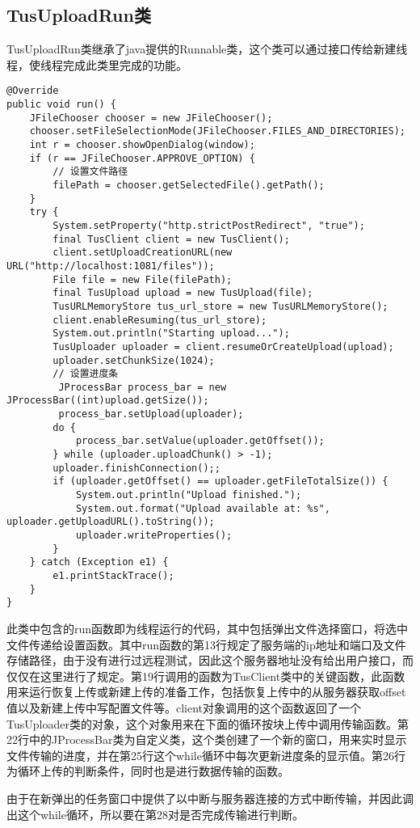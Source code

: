 \documentclass[bachelor]{thesis-uestc}
\begin{document}
\subsection{TusUploadRun类}
TusUploadRun类继承了java提供的Runnable类，这个类可以通过接口传给新建线程，使线程完成此类里完成的功能。
\begin{lstlisting}[title=TusUploadRun类中的线程运行函数]
@Override
public void run() {
	JFileChooser chooser = new JFileChooser();
	chooser.setFileSelectionMode(JFileChooser.FILES_AND_DIRECTORIES);
	int r = chooser.showOpenDialog(window);
	if (r == JFileChooser.APPROVE_OPTION) {
		// 设置文件路径
		filePath = chooser.getSelectedFile().getPath();
	}
	try {
		System.setProperty("http.strictPostRedirect", "true");
		final TusClient client = new TusClient();
		client.setUploadCreationURL(new URL("http://localhost:1081/files"));
		File file = new File(filePath);
		final TusUpload upload = new TusUpload(file);
		TusURLMemoryStore tus_url_store = new TusURLMemoryStore();
		client.enableResuming(tus_url_store);
		System.out.println("Starting upload...");
		TusUploader uploader = client.resumeOrCreateUpload(upload);
		uploader.setChunkSize(1024);
		// 设置进度条
		 JProcessBar process_bar = new JProcessBar((int)upload.getSize());
		 process_bar.setUpload(uploader);
		do {
			process_bar.setValue(uploader.getOffset());
		} while (uploader.uploadChunk() > -1);
		uploader.finishConnection();;
		if (uploader.getOffset() == uploader.getFileTotalSize()) {
			System.out.println("Upload finished.");
			System.out.format("Upload available at: %s", uploader.getUploadURL().toString());
			uploader.writeProperties();
		}
	} catch (Exception e1) {
		e1.printStackTrace();
	}
}
\end{lstlisting}
\par 此类中包含的run函数即为线程运行的代码，其中包括弹出文件选择窗口，将选中文件传递给设置函数。其中run函数的第13行规定了服务端的ip地址和端口及文件存储路径，由于没有进行过远程测试，因此这个服务器地址没有给出用户接口，而仅仅在这里进行了规定。第19行调用的函数为TusClient类中的关键函数，此函数用来运行恢复上传或新建上传的准备工作，包括恢复上传中的从服务器获取offset值以及新建上传中写配置文件等。client对象调用的这个函数返回了一个TusUploader类的对象，这个对象用来在下面的循环按块上传中调用传输函数。第22行中的JProcessBar类为自定义类，这个类创建了一个新的窗口，用来实时显示文件传输的进度，并在第25行这个while循环中每次更新进度条的显示值。第26行为循环上传的判断条件，同时也是进行数据传输的函数。
\par 由于在新弹出的任务窗口中提供了以中断与服务器连接的方式中断传输，并因此调出这个while循环，所以要在第28对是否完成传输进行判断。
\end{document}
